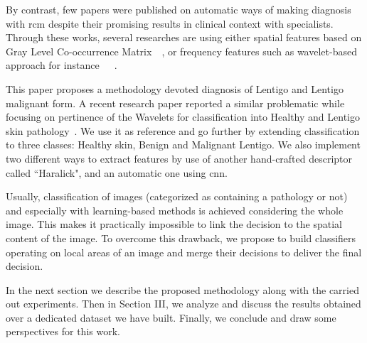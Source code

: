 By contrast, few papers were published on automatic ways of making diagnosis with \ac{rcm} despite their promising results in clinical context with specialists. Through these works, several researches are using either spatial features based on Gray Level Co-occurrence Matrix~\cite{Wiltgen2008}~\cite{Koller2011}, or frequency features such as wavelet-based approach for instance~\cite{Wiltgen2008}~\cite{Koller2011}~\cite{Halimi2017a}.\par 
This paper proposes a methodology devoted diagnosis of Lentigo and Lentigo malignant form. A recent research paper reported a similar problematic while focusing on pertinence of the Wavelets for classification into Healthy and Lentigo skin pathology~\cite{Halimi2017a}. We use it as reference and go further by extending classification to three classes: Healthy skin, Benign and Malignant Lentigo. We also implement two different ways to extract features by use of another hand-crafted descriptor called “Haralick", and an automatic one using \ac{cnn}.\par
Usually, classification of images (categorized as containing a pathology or not) and especially with learning-based methods is achieved considering the whole image. This makes it practically impossible to link the decision to the spatial content of the image. To overcome this drawback, we propose to build classifiers operating on local areas of an image and merge their decisions to deliver the final decision.\par
In the next section we describe the proposed methodology along with the carried out experiments. Then in Section III, we analyze and discuss the results obtained over a dedicated dataset we have built. Finally, we conclude and draw some perspectives for this work.\par